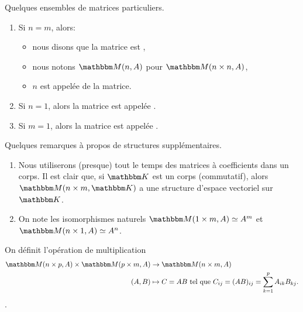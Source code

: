 \begin{definition}
Quelques ensembles de matrices particuliers.
  \begin{enumerate}
  \item Si \( n=m\), alors:
  \begin{itemize}
    \item nous disons que la matrice est ,
    \item nous notons \( \eM(n,A)\) pour \( \eM(n\times n,A)\),
    \item \( n \) est appelée  de la matrice.
  \end{itemize}
  \item Si \( n = 1 \), alors la matrice est appelée .
    \item Si \( m = 1 \), alors la matrice est appelée .
  \end{enumerate}
\end{definition}

\begin{remark}    \label{isoNatMatricesPuissances}
    Quelques remarques à propos de structures supplémentaires.
\begin{enumerate}
    \item
        Nous utiliserons (presque) tout le temps des matrices à coefficients dans un corps. Il est clair que, si \( \eK \) est un corps (commutatif), alors \( \eM(n\times m,\eK) \) a une structure d'espace vectoriel sur \( \eK \).
     \item
         On note les isomorphismes naturels \( \eM(1\times m,A) \simeq A^m\) et \( \eM(n\times 1,A) \simeq A^n\).       
\end{enumerate}
\end{remark}

\begin{definition}  \label{DEF_produitMatrices}
    On définit l'opération de multiplication
    \begin{equation}
        \begin{aligned}
             \eM(n\times p,A)\times \eM(p\times m,A)&\to \eM(n\times m,A) \\
             (A,B)&\mapsto C = AB \tq C_{ij} = (AB)_{ij}=\sum_{k=1}^pA_{ik}B_{kj}.
        \end{aligned}
    \end{equation}.
\end{definition}

